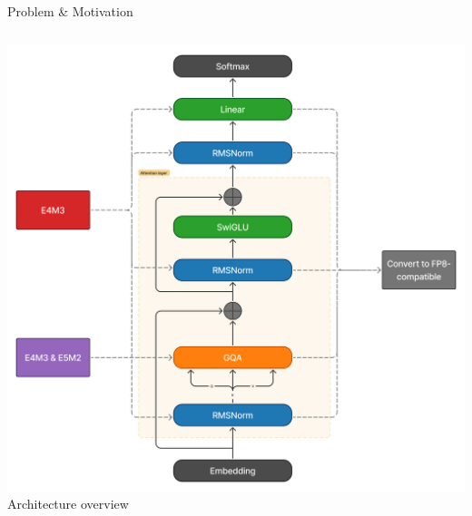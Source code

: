\begin{frame}[squeeze]{Problem \& Motivation}
\begin{columns}[c]
\begin{column}{0.42\textwidth}
    \centering
    \includegraphics[width=\textwidth]{figures/fp8_convert.png}
    \tiny Architecture overview
\end{column}
\end{columns}

\end{frame}
